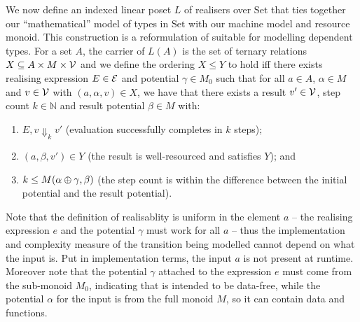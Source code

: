 \documentclass[acmsmall,review,screen,anonymous]{acmart}
\newcommand{\Set}{\mathrm{Set}}
\begin{document}
We now define an indexed linear poset $L$ of realisers over $\Set$
that ties together our ``mathematical'' model of types in $\Set$ with
our machine model and resource monoid. This construction is a
reformulation of \cite{hoffmann-dallago} suitable for modelling
dependent types. For a set $A$, the carrier of $L(A)$ is the set of
ternary relations $X \subseteq A \times M \times \mathcal{V}$ and we
define the ordering $X \leq Y$ to hold iff there exists realising
expression $E \in \mathcal{E}$ and potential $\gamma \in M_0$ such that
for all $a \in A$, $\alpha \in M$ and $v \in \mathcal{V}$ with
$(a,\alpha,v) \in X$, we have that there exists a result
$v' \in \mathcal{V}$, step count $k \in \mathbb{N}$ and result potential
$\beta \in M$ with:
\begin{enumerate}
\item $E, v \Downarrow_k v'$ (evaluation successfully completes in $k$ steps);
\item $(a, \beta, v') \in Y$ (the result is well-resourced and
  satisfies $Y$); and
\item $k \leq M(\alpha \oplus \gamma, \beta)$ (the step count is within the
  difference between the initial potential and the result potential).
\end{enumerate}
Note that the definition of realisablity is uniform in the element $a$
-- the realising expression $e$ and the potential $\gamma$ must work
for all $a$ -- thus the implementation and complexity measure of the
transition being modelled cannot depend on what the input is. Put in
implementation terms, the input $a$ is not present at
runtime. Moreover note that the potential $\gamma$ attached to the
expression $e$ must come from the sub-monoid $M_0$, indicating that is
intended to be data-free, while the potential $\alpha$ for the input
is from the full monoid $M$, so it can contain data and functions.
\end{document}
